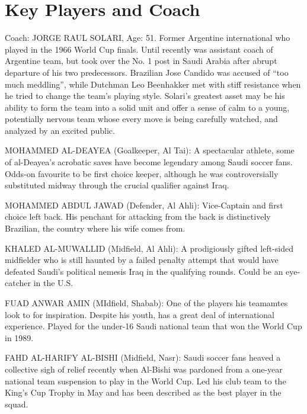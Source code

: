 \section{Key Players and Coach}
Coach:
JORGE RAUL SOLARI, Age: 51. Former Argentine international who played in the
1966 World Cup finals. Until recently was assistant coach of Argentine team, 
but took over the No. 1 post in Saudi Arabia after abrupt departure of his two
predecessors. Brazilian Jose Candido was accused of ``too much meddling'', while
Dutchman Leo Beenhakker met with stiff resistance when he tried to change the
team's playing style. Solari's greatest asset may be his ability to form the
team into a solid unit and offer a sense of calm to a young, potentially 
nervous team whose every move is being carefully watched, and analyzed by an 
excited public.

MOHAMMED AL-DEAYEA (Goalkeeper, Al Tai):
A spectacular athlete, some of al-Deayea's acrobatic saves have become 
legendary among Saudi soccer fans. Odds-on favourite to be first choice keeper, 
although he was controversially substituted midway through the crucial 
qualifier against Iraq.

MOHAMMED ABDUL JAWAD (Defender, Al Ahli):
Vice-Captain and first choice left back. His penchant for attacking from the 
back is distinctively Brazilian, the country where his wife comes from.

KHALED AL-MUWALLID (Midfield, Al Ahli):
A prodigiously gifted left-sided midfielder who is still haunted by a failed 
penalty attempt that would have defeated Saudi's political nemesis Iraq in the 
qualifying rounds. Could be an eye-catcher in the U.S.

FUAD ANWAR AMIN (MIdfield, Shabab):
One of the players his teamamtes look to for inspiration. Despite his youth, 
has a great deal of international experience. Played for the under-16 Saudi 
national team that won the World Cup in 1989.

FAHD AL-HARIFY AL-BISHI (Midfield, Nasr):
Saudi soccer fans heaved a collective sigh of relief recently when Al-Bishi was 
pardoned from a one-year national team suspension to play in the World Cup. Led 
his club team to the King's Cup Trophy in May and has been described as the 
best player in the squad.
